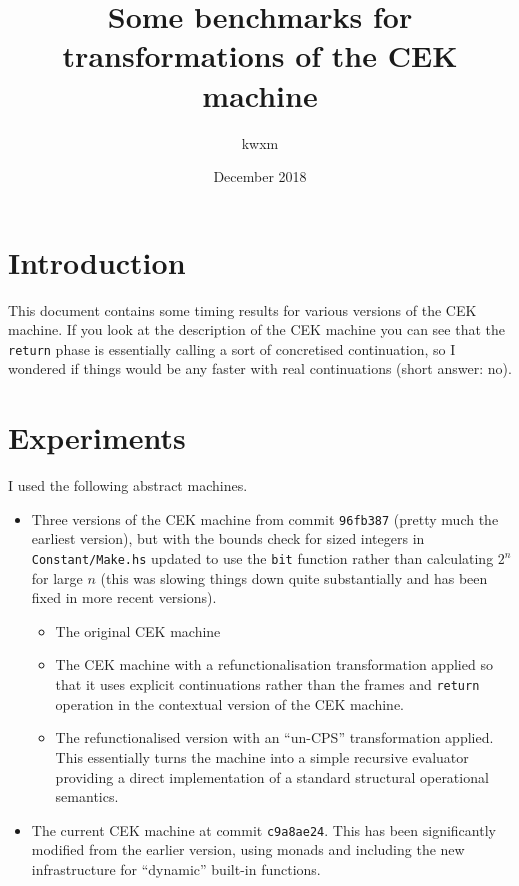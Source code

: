 \documentclass[a4paper]{article}
\author{kwxm}
\date{December 2018}
\title{Some benchmarks for transformations of the CEK machine}
\begin{document}
\maketitle

\section*{Introduction}

\noindent This document contains some timing results for various
versions of the CEK machine.  If you look at the description of the
CEK machine you can see that the \texttt{return} phase is essentially
calling a sort of concretised continuation, so I wondered if things
would be any faster with real continuations (short answer: no).

\section*{Experiments}
\noindent I used the following abstract machines.

\begin{itemize}
\item Three versions of the CEK machine from commit \texttt{96fb387}
  (pretty much the earliest version), but with the bounds check for
  sized integers in \texttt{Constant/Make.hs} updated to use the
  \texttt{bit} function rather than calculating $2^n$ for large $n$
  (this was slowing things down quite substantially and has been fixed
  in more recent versions).
\begin{itemize}
\item The original CEK machine
\item The CEK machine with a refunctionalisation transformation
  applied so that it uses explicit continuations rather than
  the frames and \texttt{return} operation in the contextual version
  of the CEK machine.
\item The refunctionalised version with an ``un-CPS'' transformation
  applied.  This essentially turns the machine into a simple recursive
  evaluator providing a direct implementation of a standard structural
  operational semantics.
\end{itemize}
\item The current CEK machine at commit \texttt{c9a8ae24}.  This has been
  significantly modified from the earlier version, using monads and
  including the new infrastructure for ``dynamic'' built-in functions.
\end{itemize}
\end{document}
